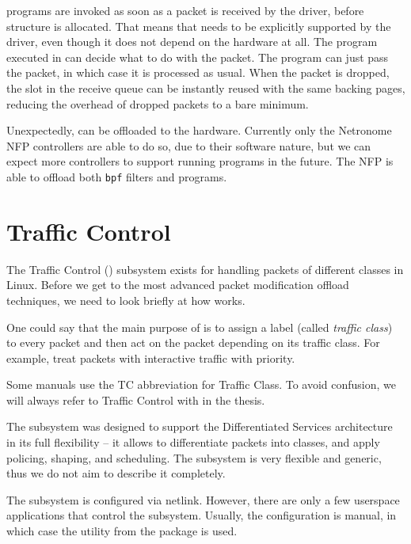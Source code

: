  programs are invoked as soon as a packet is received by the driver,
before \skb{} structure is allocated. That means that  needs to be
explicitly supported by the driver, even though it does not depend on the hardware at all.
The program executed in  can decide what to do with the packet. The
program can just pass the packet, in which case it is processed as usual. When
the packet is dropped, the slot in the receive queue can be instantly reused
with the same backing pages, reducing the overhead of dropped packets to a bare
minimum.

Unexpectedly,  can be offloaded to the hardware. Currently only the
Netronome NFP controllers are able to do so, due to their software nature, but
we can expect more controllers to support running  programs in the future. The
NFP is able to offload both  \texttt{bpf} filters and  programs.

\section{Traffic Control}
\label{sec:tc}

\newcommand{\qdisc}{\a{qdisc}}

The Traffic Control () subsystem exists for handling packets of different
classes in Linux. Before we get to the most advanced packet modification offload
techniques, we need to look briefly at how  works.

One could say that the main purpose of  is to assign a label (called
\emph{traffic class}) to every packet and then act on the packet depending on
its traffic class. For example, treat packets with interactive traffic with
priority.

Some manuals use the TC abbreviation for Traffic Class. To avoid confusion, we
will always refer to Traffic Control with  in the thesis.

The  subsystem was designed to support the Differentiated Services architecture in
its full flexibility -- it allows to differentiate packets into classes, and apply
policing, shaping, and scheduling. The subsystem is very flexible and generic,
thus we do not aim to describe it completely.

The subsystem is configured via netlink. However, there are only a few
userspace applications that control the  subsystem. Usually, the
configuration is manual, in which case the  utility from the 
package is used.

